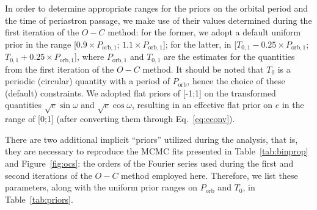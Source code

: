 \documentclass[twocolumn,times]{aastex63}
\begin{document}
In order to determine appropriate ranges for the priors on the orbital period and the time of periastron passage, we make use of their
values determined during the first iteration of the $O-C$ method: for the former, we adopt a default uniform prior in the range
[$0.9\times P_{\mathrm{orb},1}$; $1.1\times P_{\mathrm{orb},1}$]; for the latter, in
[$T_{0,1} - 0.25 \times P_{\mathrm{orb},1}$; $T_{0,1} + 0.25 \times P_{\mathrm{orb},1}$], where $P_{\mathrm{orb},1}$ and $T_{0,1}$
are the estimates for the quantities from the first iteration of the $O-C$ method. It should be noted that $T_0$ is a periodic (circular)
quantity with a period of $P_{\mathrm{orb}}$, hence the choice of these (default) constraints.
We adopted flat priors of [-1;1] on the transformed quantities $\sqrt{e} \sin \omega$ and $\sqrt{e} \cos \omega$,
resulting in an effective flat prior on $e$ in the range of [0;1] (after converting them through Eq.~\ref{eq:econv}).

There are two additional implicit ``priors'' utilized during the analysis, that is, they are necessary to reproduce the MCMC
fits presented in Table~\ref{tab:binprop} and Figure~\ref{fig:ocs}: the orders of the Fourier series used during the first and
second iterations of the $O-C$ method employed here. Therefore, we list these parameters, along with the uniform prior ranges on
$P_\mathrm{orb}$ and $T_{0}$, in Table~\ref{tab:priors}.


{}

\end{document}
